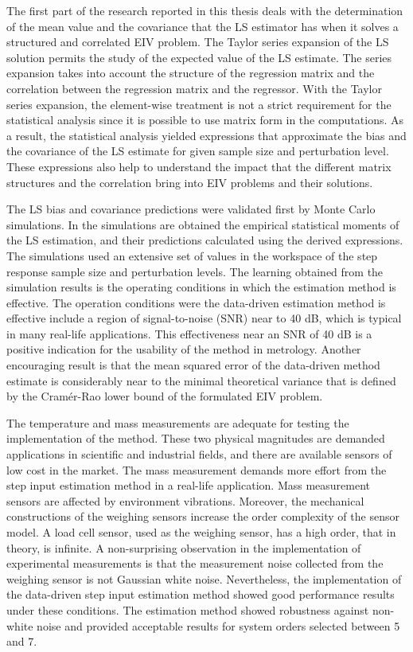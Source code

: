 The first part of the research reported in this thesis deals with the determination of the mean value and the covariance that the LS estimator has when it solves a structured and correlated EIV problem.
The Taylor series expansion of the LS solution permits the study of the expected value of the LS estimate.
The series expansion takes into account the structure of the regression matrix and the correlation between the regression matrix and the regressor.
With the Taylor series expansion, the element-wise treatment is not a strict requirement for the statistical analysis since it is possible to use matrix form in the computations.
As a result, the statistical analysis yielded expressions that approximate the bias and the covariance of the LS estimate for given sample size and perturbation level.
These expressions also help to understand the impact that the different matrix structures and the correlation bring into EIV problems and their solutions.


The LS bias and covariance predictions were validated first by Monte Carlo simulations. 
In the simulations are obtained the empirical statistical moments of the LS estimation, and their predictions calculated using the derived expressions.
The simulations used an extensive set of values in the workspace of the step response sample size and perturbation levels.
The learning obtained from the simulation results is the operating conditions in which the estimation method is effective.
The operation conditions were the data-driven estimation method is effective include a region of signal-to-noise (SNR) near to 40 dB, which is typical in many real-life applications.
This effectiveness near an SNR of 40 dB is a positive indication for the usability of the method in metrology.
Another encouraging result is that the mean squared error of the data-driven method estimate is considerably near to the minimal theoretical variance that is defined by the Cram\'er-Rao lower bound of the formulated EIV problem.

The temperature and mass measurements are adequate for testing the implementation of the method.
These two physical magnitudes are demanded applications in scientific and industrial fields, and there are available sensors of low cost in the market.
The mass measurement demands more effort from the step input estimation method in a real-life application.
Mass measurement sensors are affected by environment vibrations.
Moreover, the mechanical constructions of the weighing sensors increase the order complexity of the sensor model.
A load cell sensor, used as the weighing sensor, has a high order, that in theory, is infinite. 
A non-surprising observation in the implementation of experimental measurements is that the measurement noise collected from the weighing sensor is not Gaussian white noise.
Nevertheless, the implementation of the data-driven step input estimation method showed good performance results under these conditions. 
The estimation method showed robustness against non-white noise and provided acceptable results for system orders selected between 5 and 7.

